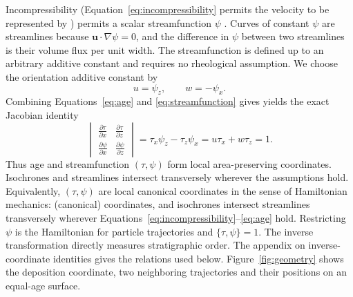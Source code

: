 \documentclass[review]{igs}
\providecommand{\DIFadd}[1]{{\protect\color{blue} \sf #1}} %
\providecommand{\DIFdel}[1]{{\protect\color{red} \scriptsize #1}} %
\providecommand{\DIFaddbegin}{} %
\providecommand{\DIFaddend}{} %
\providecommand{\DIFdelbegin}{} %
\providecommand{\DIFdelend}{} %
\newcommand{\DIFscaledelfig}{0.5}
\newlength{\DIFdelgraphicswidth} %
\newlength{\DIFdelgraphicsheight} %
\newcommand{\DIFaddincludegraphics}[2][]{{\color{blue}\fbox{\DIFOincludegraphics[#1]{#2}}}} %
\newcommand{\DIFdelincludegraphics}[2][]{%
\sbox{\DIFdelgraphicsbox}{\DIFOincludegraphics[#1]{#2}}%
\settoboxwidth{\DIFdelgraphicswidth}{\DIFdelgraphicsbox} %
\settoboxtotalheight{\DIFdelgraphicsheight}{\DIFdelgraphicsbox} %
\scalebox{\DIFscaledelfig}{%
\parbox[b]{\DIFdelgraphicswidth}{\usebox{\DIFdelgraphicsbox}\\[-\baselineskip] \rule{\DIFdelgraphicswidth}{0em}}\llap{\resizebox{\DIFdelgraphicswidth}{\DIFdelgraphicsheight}{%
\setlength{\unitlength}{\DIFdelgraphicswidth}%
\begin{picture}(1,1)%
\thicklines\linethickness{2pt} %
{\color[rgb]{1,0,0}\put(0,0){\framebox(1,1){}}}%
{\color[rgb]{1,0,0}\put(0,0){\line( 1,1){1}}}%
{\color[rgb]{1,0,0}\put(0,1){\line(1,-1){1}}}%
\end{picture}%
}\hspace*{3pt}}} %
} %
\DeclareRobustCommand{\DIFaddbegin}{\DIFOaddbegin \let\includegraphics\DIFaddincludegraphics} %
\DeclareRobustCommand{\DIFaddend}{\DIFOaddend \let\includegraphics\DIFOincludegraphics} %
\DeclareRobustCommand{\DIFdelbegin}{\DIFOdelbegin \let\includegraphics\DIFdelincludegraphics} %
\DeclareRobustCommand{\DIFdelend}{\DIFOaddend \let\includegraphics\DIFOincludegraphics} %
\begin{document}
\DIFaddbegin \DIFadd{Incompressibility (}\DIFaddend Equation~\ref{eq:incompressibility}\DIFdelbegin \DIFdel{permits the velocity to be represented by }\DIFdelend \DIFaddbegin \DIFadd{) permits }\DIFaddend a scalar streamfunction \(\psi\) \DIFdelbegin \DIFdel{. Curves of constant \(\psi\) are streamlines because \(\bm{u}\cdot\nabla\psi=0\), and the difference in \(\psi\) between two streamlines is their volume flux per unit width. The streamfunction is }\DIFdelend defined up to an \DIFdelbegin \DIFdel{arbitrary additive constant and requires no rheological assumption. We choose the orientation
}\DIFdelend \DIFaddbegin \DIFadd{additive constant by
}\DIFaddend \begin{equation}
 u=\psi_z,
 \qquad
 w=-\psi_x.
 \label{eq:streamfunction}
\end{equation}
Combining Equations~\ref{eq:age} and \ref{eq:streamfunction} \DIFdelbegin \DIFdel{gives }\DIFdelend \DIFaddbegin \DIFadd{yields }\DIFaddend the exact Jacobian identity
\begin{equation}
\begin{vmatrix}
\displaystyle\frac{\partial\tau}{\partial x} & \displaystyle\frac{\partial\tau}{\partial z} \\[1.2ex]
\displaystyle\frac{\partial\psi}{\partial x} & \displaystyle\frac{\partial\psi}{\partial z}
\end{vmatrix}
=\tau_x\psi_z-\tau_z\psi_x
=u\tau_x+w\tau_z
=1.
\label{eq:agepsiJacobian}
\end{equation}
Thus \DIFdelbegin \DIFdel{age and streamfunction }\DIFdelend \DIFaddbegin \DIFadd{\((\tau,\psi)\) }\DIFaddend form local area-preserving \DIFdelbegin \DIFdel{coordinates. Isochrones and streamlines intersect transversely wherever the assumptions hold. Equivalently, \((\tau,\psi)\) are local canonical coordinates in the sense of Hamiltonian mechanics: }\DIFdelend \DIFaddbegin \DIFadd{(canonical) coordinates, and isochrones intersect streamlines transversely wherever Equations~\ref{eq:incompressibility}--\ref{eq:age} hold. Restricting }\DIFaddend \(\psi\) \DIFdelbegin \DIFdel{is the Hamiltonian for particle trajectories and \(\{\tau,\psi\}=1\). The inverse transformation directly measures stratigraphic order. The appendix on inverse-coordinate identities gives the relations used below. Figure~\ref{fig:geometry} shows the deposition coordinate, two neighboring trajectories and their positions on an equal-age surface.
}%
\end{document}
